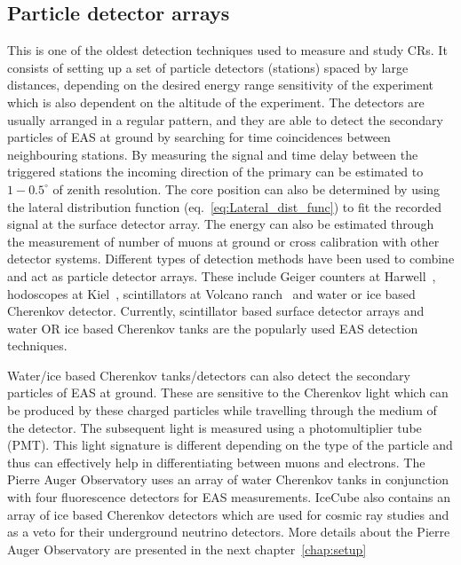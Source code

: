 \subsection{Particle detector arrays}
\label{sec:EAS_particle}
This is one of the oldest detection techniques used to measure and study CRs. It consists of setting up a set of particle detectors (stations) spaced by large distances, depending on the desired energy range sensitivity of the experiment which is also dependent on the altitude of the experiment. The detectors are usually arranged in a regular pattern, and they are able to detect the secondary particles of EAS at ground by searching for time coincidences between neighbouring stations. By measuring the signal and time delay between the triggered stations the incoming direction of the primary can be estimated to $1-0.5^{\circ}$ of zenith resolution. The core position can also be determined by using the lateral distribution function (eq.~\ref{eq:Lateral_dist_func}) to fit the recorded signal at the surface detector array. The energy can also be estimated through the measurement of number of muons at ground or cross calibration with other detector systems. Different types of detection methods have been used to combine and act as particle detector arrays. These include Geiger counters at Harwell~\cite{1953Natur.171..349G}, hodoscopes at Kiel~\cite{1965ICRC....2..738B}, scintillators at Volcano ranch~\cite{Linsley1961485} and water or ice based Cherenkov detector. Currently, scintillator based surface detector arrays and water OR ice based Cherenkov tanks are the popularly used EAS detection techniques. 

Water/ice based Cherenkov tanks/detectors can also detect the secondary particles of EAS at ground. These are sensitive to the Cherenkov light which can be produced by these charged particles while travelling through the medium of the detector. The subsequent light is measured using a photomultiplier tube (PMT). This light signature is different depending on the type of the particle and thus can effectively help in differentiating between muons and electrons. The Pierre Auger Observatory uses an array of water Cherenkov tanks in conjunction with four fluorescence detectors for EAS measurements. IceCube also contains an array of ice based Cherenkov detectors which are used for cosmic ray studies and as a veto for their underground neutrino detectors. More details about the Pierre Auger Observatory are presented in the next chapter~\ref{chap:setup}

